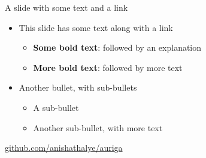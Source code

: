 \begin{frame}{A slide with some text and a link}

  \begin{itemize}
    \item This slide has some text along with a link
      \begin{itemize}
        \item \textbf{Some bold text}: followed by an explanation
        \item \textbf{More bold text}: followed by more text
      \end{itemize}
    \item Another bullet, with sub-bullets
      \begin{itemize}
        \item A sub-bullet
        \item Another sub-bullet, with more text
      \end{itemize}
  \end{itemize}

  \vspace{2ex}
  \begin{center}
    \color{blue} \href{https://github.com/anishathalye/auriga}{github.com/anishathalye/auriga}
  \end{center}

\end{frame}
